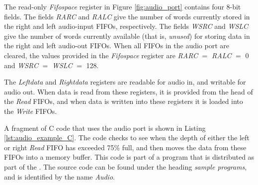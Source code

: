 The read-only {\it Fifospace} register in Figure \ref{fig:audio_port} contains four 8-bit fields.
The fields {\it RARC} and {\it RALC} give the number of words currently stored in the 
right and left audio-input FIFOs, respectively. The fields {\it WSRC} and {\it WSLC} give 
the number of words currently available (that is, {\it unused}) for storing data in the right 
and left audio-out FIFOs. When all FIFOs in the audio port are cleared, the values provided 
in the {\it Fifospace} register are {\it RARC} $=$ {\it RALC} $=$ 0 
and {\it WSRC} $=$ {\it WSLC} $=$ 128.

The {\it Leftdata} and {\it Rightdata} registers are readable for audio in, and writable
for audio out. When data is read from these registers, it is provided from the head of the
{\it Read} FIFOs, and when data is written into these registers it is loaded into the {\it
Write} FIFOs.

A fragment of C code that uses the audio port is shown in Listing \ref{lst:audio_example_C}.
The code checks to
see when the depth of either the left or right {\it Read} FIFO has exceeded 75\% full, and then
moves the data from these FIFOs into a memory buffer. This code is part of a program
that is distributed as part of the \productNameMed{}. The source code can be 
found under the heading {\it sample programs}, and is identified by the name 
{\it Audio}.



